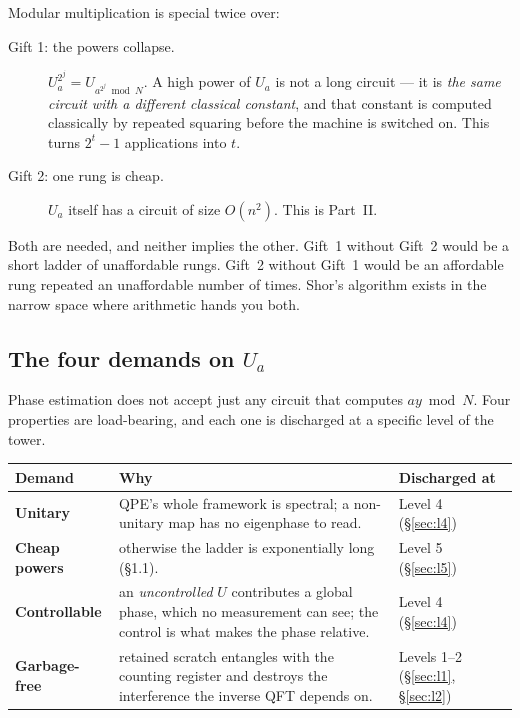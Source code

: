 \documentclass[11pt]{article}
\theoremstyle{plain}
\theoremstyle{remark}
\begin{document}
Modular multiplication is special twice over:
\begin{description}
\item[Gift 1: the powers collapse.] $U_a^{2^j}=U_{a^{2^j}\bmod N}$. A high power of $U_a$ is not a
long circuit --- it is \emph{the same circuit with a different classical constant}, and that
constant is computed classically by repeated squaring before the machine is switched on. This
turns $2^t-1$ applications into $t$.
\item[Gift 2: one rung is cheap.] $U_a$ itself has a circuit of size $O(n^2)$. This is Part~II.
\end{description}

\noindent
Both are needed, and neither implies the other. Gift~1 without Gift~2 would be a short ladder of
unaffordable rungs. Gift~2 without Gift~1 would be an affordable rung repeated an unaffordable
number of times. Shor's algorithm \cite{shor} exists in the narrow space where arithmetic hands you
both.

\subsection{The four demands on $U_a$}

Phase estimation does not accept just any circuit that computes $ay \bmod N$. Four properties are
load-bearing, and each one is discharged at a specific level of the tower.

\begin{center}
\begin{tabular}{@{}p{}p{}l@{}}
\toprule
Demand & Why & Discharged at\\
\midrule
\textbf{Unitary} & QPE's whole framework is spectral; a non-unitary map has no eigenphase to read.
& Level 4 (\S\ref{sec:l4})\\[3pt]
\textbf{Cheap powers} & otherwise the ladder is exponentially long (\S1.1). & Level 5 (\S\ref{sec:l5})\\[3pt]
\textbf{Controllable} & an \emph{uncontrolled} $U$ contributes a global phase, which no measurement
can see; the control is what makes the phase relative. & Level 4 (\S\ref{sec:l4})\\[3pt]
\textbf{Garbage-free} & retained scratch entangles with the counting register and destroys the
interference the inverse QFT depends on. & Levels 1--2 (\S\ref{sec:l1}, \S\ref{sec:l2})\\
\bottomrule
\end{tabular}
\end{center}
\end{document}
